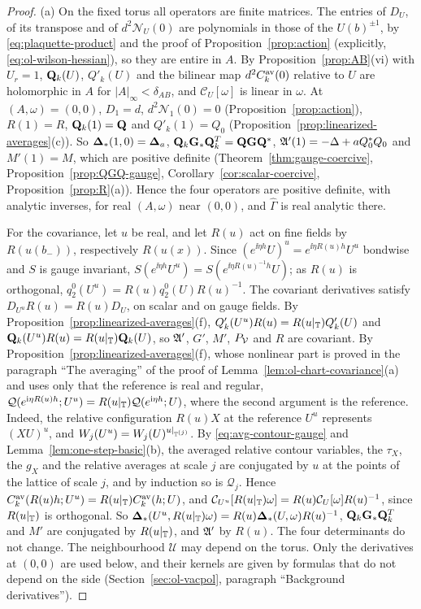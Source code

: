 \begin{proof}
(a) On the fixed torus all operators are finite matrices. The entries of $D_U$, of its transpose and of $d^2\mathcal N_U(0)$ are polynomials in those of the $U(b)^{\pm1}$, by \eqref{eq:plaquette-product} and the proof of Proposition~\ref{prop:action} (explicitly, \eqref{eq:ol-wilson-hessian}), so they are entire in $A$. By Proposition~\ref{prop:AB}(vi) with $U_r=1$, $\mathbf Q_k(U)$, $Q'_k(U)$ and the bilinear map $d^2C^{\rm av}_k(0)$ relative to $U$ are holomorphic in $A$ for $|A|_\infty<\delta_{AB}$, and $\mathcal C_U[\omega]$ is linear in $\omega$. At $(A,\omega)=(0,0)$, $D_1=d$, $d^2\mathcal N_1(0)=0$ (Proposition~\ref{prop:action}), $R(1)=R$, $\mathbf Q_k(1)=\mathbf Q$ and $Q'_k(1)=Q_0$ (Proposition~\ref{prop:linearized-averages}(c)). So $\boldsymbol{\Delta}_*(1,0)=\boldsymbol{\Delta}_a$, $\mathbf Q_k\mathbf G_*\mathbf Q_k^T=\mathbf Q\mathbf G\mathbf Q^*$, $\mathfrak A'(1)=-\Delta+aQ_0^*Q_0$ and $M'(1)=M$, which are positive definite (Theorem~\ref{thm:gauge-coercive}, Proposition~\ref{prop:QGQ-gauge}, Corollary~\ref{cor:scalar-coercive}, Proposition~\ref{prop:R}(a)). Hence the four operators are positive definite, with analytic inverses, for real $(A,\omega)$ near $(0,0)$, and $\widehat\Gamma$ is real analytic there.

For the covariance, let $u$ be real, and let $R(u)$ act on fine fields by $R(u(b_-))$, respectively $R(u(x))$. Since $(e^{\ii\eta h}U)^u=e^{\ii\eta R(u)h}U^u$ bondwise and $S$ is gauge invariant, $S(e^{\ii\eta h}U^u)=S(e^{\ii\eta R(u)^{-1}h}U)$; as $R(u)$ is orthogonal, $q_2^0(U^u)=R(u)q_2^0(U)R(u)^{-1}$. The covariant derivatives satisfy $D_{U^u}R(u)=R(u)D_U$, on scalar and on gauge fields. By Proposition~\ref{prop:linearized-averages}(f), $Q'_k(U^u)R(u)=R(u|_\mathbb T)Q'_k(U)$ and $\mathbf Q_k(U^u)R(u)=R(u|_\mathbb T)\mathbf Q_k(U)$, so $\mathfrak A'$, $G'$, $M'$, $P_\mathcal V$ and $R$ are covariant. By Proposition~\ref{prop:linearized-averages}(f), whose nonlinear part is proved in the paragraph ``The averaging'' of the proof of Lemma~\ref{lem:ol-chart-covariance}(a) and uses only that the reference is real and regular, $\mathcal Q(e^{\mathrm i\eta R(u)h};U^u)=R(u|_\mathbb T)\mathcal Q(e^{\mathrm i\eta h};U)$, where the second argument is the reference. Indeed, the relative configuration $R(u)X$ at the reference $U^u$ represents $(XU)^u$, and $W_j(U^u)=W_j(U)^{u|_{\mathbb T^{(j)}}}$. By \eqref{eq:avg-contour-gauge} and Lemma~\ref{lem:one-step-basic}(b), the averaged relative contour variables, the $\tau_X$, the $g_X$ and the relative averages at scale $j$ are conjugated by $u$ at the points of the lattice of scale $j$, and by induction so is $\mathcal Q_j$. Hence $C^{\rm av}_k(R(u)h;U^u)=R(u|_\mathbb T)C^{\rm av}_k(h;U)$, and $\mathcal C_{U^u}[R(u|_\mathbb T)\omega]=R(u)\mathcal C_U[\omega]R(u)^{-1}$, since $R(u|_\mathbb T)$ is orthogonal. So $\boldsymbol{\Delta}_*(U^u,R(u|_\mathbb T)\omega)=R(u)\boldsymbol{\Delta}_*(U,\omega)R(u)^{-1}$, $\mathbf Q_k\mathbf G_*\mathbf Q_k^T$ and $M'$ are conjugated by $R(u|_\mathbb T)$, and $\mathfrak A'$ by $R(u)$. The four determinants do not change. The neighbourhood $\mathcal U$ may depend on the torus. Only the derivatives at $(0,0)$ are used below, and their kernels are given by formulas that do not depend on the side (Section~\ref{sec:ol-vacpol}, paragraph ``Background derivatives'').


\end{proof}
